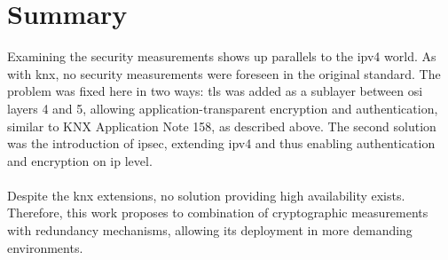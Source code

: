 \section{Summary}
Examining the security measurements shows up parallels to the \gls{ipv4} world. As with \gls{knx}, no security measurements were foreseen in the
original standard. The problem was
fixed here in two ways: \gls{tls} was added as a sublayer between \gls{osi} layers 4 and 5, allowing application-transparent encryption and authentication, 
similar to KNX Application Note 158, as described above. The second solution was the introduction of \gls{ipsec}, extending \gls{ipv4} and thus enabling authentication and encryption on \gls{ip} level.
\\
\\
Despite the \gls{knx} extensions, no solution providing high availability exists. Therefore, this work proposes to combination of cryptographic measurements with
redundancy mechanisms, allowing its deployment in more demanding environments.